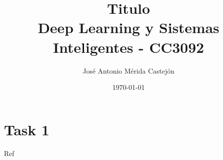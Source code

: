 \documentclass[11pt]{article}
\title{\textbf{Titulo} \vspace{1em}\\
  Deep Learning y Sistemas Inteligentes - CC3092}
\author{José Antonio Mérida Castejón}
\date{\today}
\begin{document}
\maketitle

\section*{Task 1}
Ref~\cite{reference}

\newpage

\printbibliography
\end{document}
